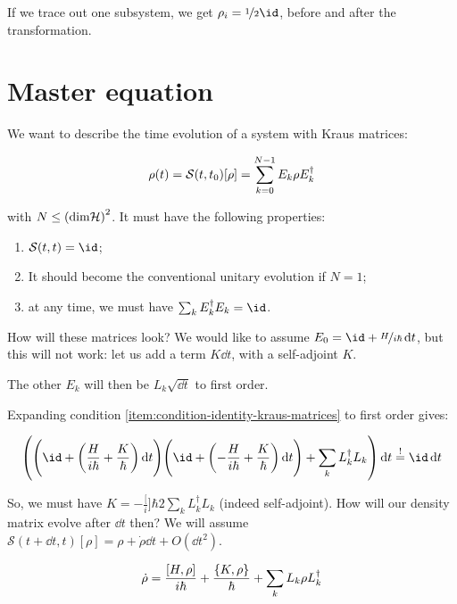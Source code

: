 \documentclass[main.tex]{subfiles}
\begin{document}
If we trace out one subsystem, we get \(\rho_i = \frac[i]{1}{2} \id\), before and after the transformation.

\section{Master equation}

We want to describe the time evolution of a system with Kraus matrices:

\begin{equation}
    \rho(t) = \mathcal S (t, t_0) \qty[\rho]
    = \sum _{k=0}  ^{N-1} E_k \rho E_k ^\dag
\end{equation}

with \(N \leq \qty(\text{dim} \mathcal H)^2 \). It must have the following properties:

\begin{enumerate}
    \item \(\mathcal S (t, t)=\id\);
    \item It should become the conventional unitary evolution if \(N=1\);
    \item at any time, we must have \(\sum _k E_k ^\dag E_k  = \id\). \label{item:condition-identity-kraus-matrices}
\end{enumerate}

How will these matrices look? We would like to assume \(E_0 = \id +\frac[i]{H}{i \hbar} \dd{t} \), but this will not work: let us add a term \(K \dd{t}\), with a self-adjoint \(K\).

The other \(E_k\) will then be \(L_k \sqrt{\dd{t}} \) to first order.

Expanding condition \ref{item:condition-identity-kraus-matrices} to first order gives:

\begin{equation}
    \qty(
    \qty(\id + \qty(\frac{H}{i \hbar} + \frac{K}{\hbar})\dd{t})
    \qty(\id + \qty(-\frac{H}{i \hbar} + \frac{K}{\hbar})\dd{t})
    +
    \sum _{k}  L_k ^\dag L_k
    )\dd{t} \overset{!}{=} \id \dd{t}
\end{equation}

So, we must have \(K = -\frac[i]{\hbar}{2} \sum _{k}  L_k ^\dag L_k  \) (indeed self-adjoint).
How will our density matrix evolve after \(\dd{t}\) then? We will assume \(\mathcal S(t+\dd{t}, t) [\rho] = \rho + \dot{\rho} \dd{t} + O (\dd{t}^2)\).

\begin{equation}
    \dot{\rho} = \frac{[H, \rho]}{i \hbar} + \frac{\qty{K, \rho}}{\hbar} + \sum _k L_k \rho L_k ^\dag
\end{equation}
\end{document}
